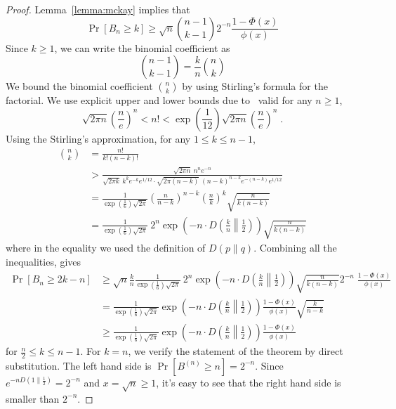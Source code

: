 \documentclass{article}
\begin{document}
\begin{proof}
Lemma~\ref{lemma:mckay} implies that
$$
\Pr \left[ B_n \ge k \right] \ge \sqrt{n} \binom{n-1}{k-1} 2^{-n} \frac{1 - \Phi(x)}{\phi(x)}
$$
Since $k \ge 1$, we can write the binomial coefficient as
$$
\binom{n-1}{k-1} = \frac{k}{n} \binom{n}{k}
$$
We bound the binomial coefficient $\binom{n}{k}$ by using Stirling's formula for the factorial.
We use explicit upper and lower bounds due to~\cite{Robbins-1955} valid for any $n\ge 1$,
$$
\sqrt{2 \pi n} \left( \frac{n}{e} \right)^n < n! < \exp\left(\frac{1}{12}\right) \sqrt{2 \pi n} \left( \frac{n}{e} \right)^n \; .
$$
Using the Stirling's approximation, for any $1\le k \le n-1$,
\begin{align*}
\binom{n}{k}
& = \frac{n!}{k! (n-k)!} \\
& > \frac{\sqrt{2\pi n} \ n^n e^{-n}}{\sqrt{2\pi k} \ k^k e^{-k} e^{1/12} \cdot \sqrt{2\pi (n-k)} \ (n-k)^{n-k} e^{-(n-k)} e^{1/12}} \\
& = \frac{1}{\exp\left(\frac{1}{6}\right) \sqrt{2 \pi}} \left(\frac{n}{n-k}\right)^{n-k} \left(\frac{n}{k}\right)^k \sqrt{\frac{n}{k(n-k)}} \\
& = \frac{1}{\exp\left(\frac{1}{6}\right) \sqrt{2 \pi}} \ 2^n \exp\left(-n \cdot D\left(\frac{k}{n} \middle\| \frac{1}{2}\right)\right) \sqrt{\frac{n}{k(n-k)}}
\end{align*}
where in the equality we used the definition of $D(p\|q)$. Combining all the inequalities, gives
\begin{align*}
\Pr \left[ B_n \ge 2k - n \right]
& \ge \sqrt{n} \frac{k}{n} \frac{1}{\exp\left(\frac{1}{6}\right) \sqrt{2 \pi}} \ 2^n \exp\left(-n \cdot D\left(\frac{k}{n} \middle\| \frac{1}{2}\right)\right) \sqrt{\frac{n}{k(n-k)}} 2^{-n} \; \frac{1 - \Phi(x)}{\phi(x)} \\
& = \frac{1}{\exp\left(\frac{1}{6}\right) \sqrt{2\pi}} \exp\left(-n \cdot D\left(\frac{k}{n} \middle\| \frac{1}{2}\right)\right) \frac{1 - \Phi(x)}{\phi(x)} \sqrt{\frac{k}{n-k}} \\
& \geq \frac{1}{\exp\left(\frac{1}{6}\right) \sqrt{2\pi}} \exp\left(-n \cdot D\left(\frac{k}{n} \middle\| \frac{1}{2}\right)\right) \frac{1 - \Phi(x)}{\phi(x)}
\end{align*}
for $\frac{n}{2} \le k \le n - 1$. For $k=n$, we verify the statement of the theorem by direct substitution. The left hand side is $\Pr[B^{(n)} \ge n] = 2^{-n}$.
Since $e^{-nD(1\|\frac{1}{2})} = 2^{-n}$ and $x=\sqrt{n} \ge 1$, it's easy to see that the right hand side is smaller than $2^{-n}$.
\end{proof}
\end{document}
